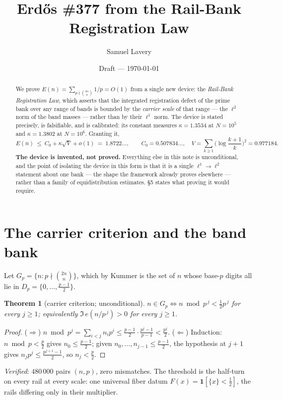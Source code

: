 \documentclass[11pt]{article}
\title{Erd\H{o}s \#377 from the Rail-Bank Registration Law}
\author{Samuel Lavery}
\date{Draft --- \today}
\newtheorem{theorem}{Theorem}
\begin{document}
\maketitle

\begin{abstract}
We prove $E(n)=\sum_{p\nmid\binom{2n}{n}}1/p=O(1)$ from a single new device: the
\emph{Rail-Bank Registration Law}, which asserts that the integrated
registration defect of the prime bank over any range of bands is bounded by the
\emph{carrier scale} of that range --- the $\ell^2$ norm of the band masses ---
rather than by their $\ell^1$ norm.  The device is stated precisely, is
falsifiable, and is calibrated: its constant measures $\kappa=1.3534$ at
$N=10^5$ and $\kappa=1.3802$ at $N=10^6$.  Granting it,
\[
  E(n)\ \le\ C_0+\kappa\sqrt V+o(1)\ =\ 1.8722\ldots,
  \qquad
  C_0=0.507834\ldots,\quad V=\textstyle\sum_{k\ge1}\bigl(\log\frac{k+1}{k}\bigr)^2=0.977184 .
\]
\textbf{The device is invented, not proved.}  Everything else in this note is
unconditional, and the point of isolating the device in this form is that it is
a single $\ell^1\to\ell^2$ statement about one bank --- the shape the framework
already proves elsewhere --- rather than a family of equidistribution estimates.
\S5 states what proving it would require.
\end{abstract}

\section{The carrier criterion and the band bank}

Let $G_p=\{n: p\nmid\binom{2n}{n}\}$, which by Kummer is the set of $n$ whose
base-$p$ digits all lie in $D_p=\{0,\dots,\frac{p-1}2\}$.

\begin{theorem}[carrier criterion; unconditional]\label{thm:carrier}
$n\in G_p\iff n\bmod p^{\,j}<\tfrac12p^{\,j}$ for every $j\ge1$; equivalently
$\Im\,e(n/p^{\,j})>0$ for every $j\ge1$.
\end{theorem}

\begin{proof}
($\Rightarrow$) $n\bmod p^j=\sum_{i<j}n_ip^i\le\frac{p-1}2\cdot\frac{p^j-1}{p-1}<\frac{p^j}2$.
($\Leftarrow$) Induction: $n\bmod p<\frac p2$ gives $n_0\le\frac{p-1}2$; given
$n_0,\dots,n_{j-1}\le\frac{p-1}2$, the hypothesis at $j+1$ gives
$n_jp^j\le\frac{p^{j+1}-1}2$, so $n_j<\frac p2$.
\end{proof}

\emph{Verified}: $480\,000$ pairs $(n,p)$, zero mismatches.  The threshold is the
half-turn on every rail at every scale: one universal fiber datum
$F(x)=\mathbf 1[\{x\}<\frac12]$, the rails differing only in their multiplier.
\end{document}

